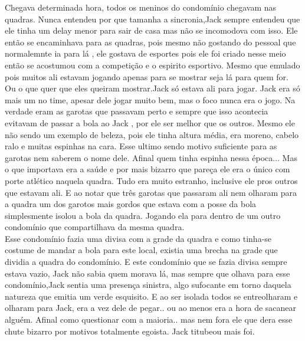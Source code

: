 \documentclass{book}
\begin{document}
 Chegava determinada hora, todos os meninos do condomínio chegavam nas quadras. Nunca entendeu por que tamanha a sincronia,Jack sempre entendeu que ele tinha um delay menor para sair de casa mas não se incomodova com isso. Ele então se encaminhava para as quadras, pois mesmo não gostando do pessoal que normalemnte ia para lá , ele gostava de esportes pois ele foi criado nesse meio então se acostumou com a competição e o espirito esportivo. Mesmo que emulado pois muitos ali estavam jogando apenas para se mostrar seja lá para quem for. Ou o que quer que eles queiram mostrar.Jack só estava ali para jogar. Jack era só mais um no time, apesar dele jogar muito bem, mas o foco nunca era o jogo. Na verdade eram as garotas que passavam perto e sempre que isso acontecia evitavam de passar a bola ao Jack , por ele ser melhor que os outros. Mesmo ele não sendo um exemplo de beleza, pois ele tinha altura média, era moreno, cabelo ralo e muitas espinhas na cara. Esse ultimo sendo motivo suficiente para as garotas nem saberem o nome dele. Afinal quem tinha espinha nessa época... Mas o que importava era a saúde e por mais bizarro que pareça ele era o único com porte atlético naquela quadra. Tudo era muito estranho, inclusive ele pros outros que estavam ali. E ao notar que três garotas que passaram ali nem olharam para a quadra um dos garotos mais gordos que estava com a posse da bola simplesmente isolou a bola da quadra. Jogando ela para dentro de um outro condomínio que compartilhava da mesma quadra. \\
 
 Esse condomínio fazia uma divisa com a grade da quadra e como tinha-se costume de mandar a bola para este local, existia uma brecha na grade que dividia a quadra do condomínio. E este condomínio que se fazia divisa sempre estava vazio, Jack não sabia quem morava lá, mas sempre que olhava para esse condomínio,Jack sentia uma presença sinistra, algo sufocante em torno daquela natureza que emitia um verde esquisito. E ao ser isolada todos se entreolharam e olharam para Jack, era a vez dele de pegar.. ou ao menos era a hora de sacanear alguém. Afinal como questionar com a maioria.. mas nem fora ele que dera esse chute bizarro por motivos totalmente egoista. Jack titubeou mais foi.\\
 
\end{document}
